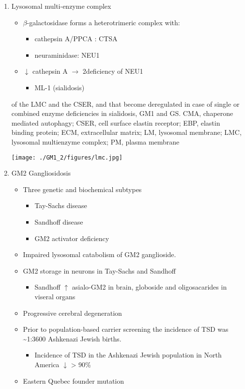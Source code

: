 \documentclass{scrartcl}
\begin{document}
\begin{enumerate}
\item Lysosomal multi-enzyme complex
\label{sec:org85d01f7}

\begin{itemize}
\item \(\beta\)-galactosidase forms a heterotrimeric complex with:
\begin{itemize}
\item cathepsin A/PPCA : CTSA
\item neuraminidase: NEU1
\end{itemize}

\item \(\downarrow\) cathepsin A \(\to\) 2\degree  deficiency of NEU1
\begin{itemize}
\item ML-1 (sialidosis)
\end{itemize}
\end{itemize}

of the LMC and the CSER, and that become deregulated in case of
single or combined enzyme deficiencies in sialidosis, GM1 and
GS. CMA, chaperone mediated autophagy; CSER, cell surface elastin
receptor; EBP, elastin binding protein; ECM, extracellular matrix;
LM, lysosomal membrane; LMC, lysosomal multienzyme complex; PM,
plasma membrane
\begin{center}
\texttt{[image: ./GM1\_2/figures/lmc.jpg]}
\label{orge0ca95f}
\end{center}

\item GM2 Gangliosidosis
\label{sec:org2730429}
\begin{itemize}
\item Three genetic and biochemical subtypes
\begin{itemize}
\item Tay-Sachs disease
\item Sandhoff disease
\item GM2 activator deficiency
\end{itemize}
\item Impaired lysosomal catabolism of GM2 ganglioside.
\item GM2 storage in neurons in Tay-Sachs and Sandhoff
\begin{itemize}
\item Sandhoff \(\uparrow\) asialo-GM2 in brain, globoside and oligosacarides in viseral organs
\end{itemize}
\item Progressive cerebral degeneration
\item Prior to population-based carrier screening the incidence of TSD was \textasciitilde{}1:3600 Ashkenazi Jewish births.
\begin{itemize}
\item Incidence of TSD in the Ashkenazi Jewish population in North America \(\downarrow\) > 90\%
\end{itemize}
\item Eastern Quebec founder mutation
\end{itemize}



\end{enumerate}
\end{document}
